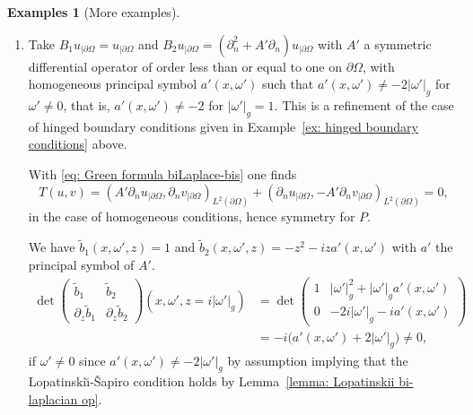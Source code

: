 \documentclass[10pt]{amsart}
\theoremstyle{plain}
\theoremstyle{definition}
\newtheorem{examples}[theorem]{Examples}
\newcommand{\LS}{Lopatinski\u{\i}-\v{S}apiro\xspace}
\newcommand{\inp}[2]{(#1, #2)}
\newcommand{\bd}{\ensuremath{_{|\partial\Omega}}}
\begin{document}
\begin{examples}[More examples]
\begin{enumerate}
We have $\tilde{b}_1(x,\omega',z)=-i z$ and
$\tilde{b}_2(x,\omega',z)=iz^3 + a'(x,\omega')$ with $a'$ the
principal symbol of $A'$.
\begin{align*}
\det
\begin{pmatrix}
\tilde{b}_1 &\tilde{b}_2 \\[
2pt]
\partial_z\tilde{b}_1& \partial_z\tilde{b}_2
\end{pmatrix} (x,\omega',z=i|\omega'|_g)
&=
\det
\begin{pmatrix}
|\omega'|_g &|\omega'|^3_g + a'(x,\omega')\\[
2pt]
- i &-3i|\omega'|^2_g
\end{pmatrix} \\
&= i \big(a'(x,\omega') -2 |\omega'|^3_g\big)\neq 0,
\end{align*}
if $\omega'\neq 0$ since $a'(x,\omega') \neq 2 |\omega'|^3_g$ by
assumption implying
that the \LS condition holds by Lemma~\ref{lemma: Lopatinskii bi-laplacian op}.

\item
Take $B_1 u\bd =u\bd$ and $B_2 u\bd
=(\partial_n^2+ A' \partial_n) u\bd$ with $A'$ a symmetric differential
operator of order less than or equal to one on
$\partial \Omega$, with homogeneous principal symbol $a'(x,\omega')$ such that
$a'(x,\omega') \neq - 2 |\omega'|_g$ for $\omega' \neq 0$, that
is, $a'(x,\omega')\neq -2$ for $|\omega'|_g=1$.
This is a refinement of the case of hinged boundary conditions given
in Example~\ref{ex: hinged boundary conditions} above.

With \eqref{eq: Green formula biLaplace-bis} one
finds
\begin{equation*}
T(u,v)
= \inp{A' \partial_n u\bd}{\partial_n v\bd}_{L^2(\partial\Omega)}
+ \inp{\partial_n u\bd}{- A' \partial_n v\bd}_{L^2(\partial\Omega)}
=0,
\end{equation*}
in the case of homogeneous conditions, hence symmetry for $P$.

We have $\tilde{b}_1(x,\omega',z)=1$ and
$\tilde{b}_2(x,\omega',z)=-z^2 -i z a'(x,\omega')$ with $a'$ the
principal symbol of $A'$.
\begin{align*}
\det
\begin{pmatrix}
\tilde{b}_1 &\tilde{b}_2 \\[
2pt]
\partial_z\tilde{b}_1& \partial_z\tilde{b}_2
\end{pmatrix} (x,\omega',z=i|\omega'|_g)
&=
\det
\begin{pmatrix}
1&|\omega'|^2_g + |\omega'|_g a'(x,\omega')\\[
2pt]
0 &-2i|\omega'|_g - i a'(x,\omega')
\end{pmatrix} \\
&= - i \big(a'(x,\omega') + 2 |\omega'|_g\big)\neq 0,
\end{align*}
if $\omega'\neq 0$ since $a'(x,\omega') \neq - 2 |\omega'|_g$ by
assumption implying
that the \LS condition holds by Lemma~\ref{lemma: Lopatinskii bi-laplacian op}.


\end{enumerate}
\end{examples}
\end{document}
